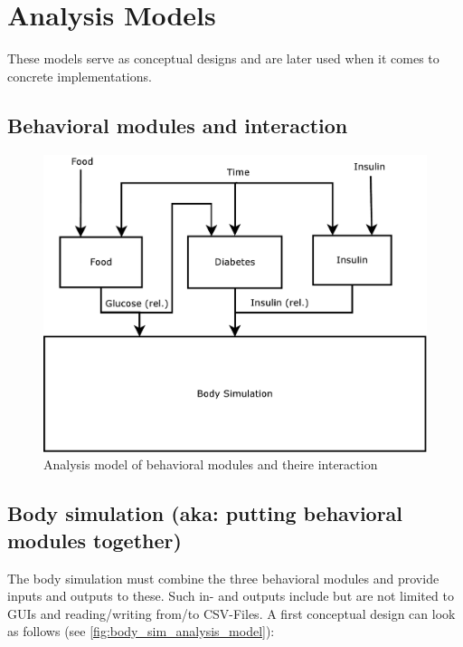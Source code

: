 \section{Analysis Models}
These models serve as conceptual designs and are later used when it comes to
concrete implementations.

\subsection{Behavioral modules and interaction}
\begin{figure}[htb]
\centering
\includegraphics[scale=0.4]{images/Analysis_Model}
\caption{Analysis model of behavioral modules and theire interaction}
\label{fig:analysis_model_behavioral_modules}
\end{figure}

\newpage
\subsection{Body simulation (aka: putting behavioral modules together)}
The body simulation must combine the three behavioral modules and provide
inputs and outputs to these.
Such in- and outputs include but are not limited to GUIs and reading/writing
from/to CSV-Files.
A first conceptual design can look as follows (see
\vref{fig:body_sim_analysis_model}):

